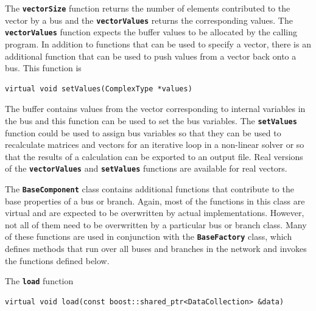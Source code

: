 The \texttt{\textbf{vectorSize}} function returns the number of elements contributed to the vector by a bus and the \texttt{\textbf{vectorValues}} returns the corresponding values. The \texttt{\textbf{vectorValues}} function expects the buffer values to be allocated by the calling program. In addition to functions that can be used to specify a vector, there is an additional function that can be used to push values from a vector back onto a bus. This function is

{
\color{red}
\begin{Verbatim}[fontseries=b]
virtual void setValues(ComplexType *values)
\end{Verbatim}
}

The buffer contains values from the vector corresponding to internal variables in the bus and this function can be used to set the bus variables. The \texttt{\textbf{setValues}} function could be used to assign bus variables so that they can be used to recalculate matrices and vectors for an iterative loop in a non-linear solver or so that the results of a calculation can be exported to an output file. Real versions of the \texttt{\textbf{vectorValues}} and \texttt{\textbf{setValues}} functions are available for real vectors.

The \texttt{\textbf{BaseComponent}} class contains additional functions that contribute to the base properties of a bus or branch. Again, most of the functions in this class are virtual and are expected to be overwritten by actual implementations. However, not all of them need to be overwritten by a particular bus or branch class. Many of these functions are used in conjunction with the \texttt{\textbf{BaseFactory}} class, which defines methods that run over all buses and branches in the network and invokes the functions defined below.

The \texttt{\textbf{load}} function

{
\color{red}
\begin{Verbatim}[fontseries=b]
virtual void load(const boost::shared_ptr<DataCollection> &data)
\end{Verbatim}
}

